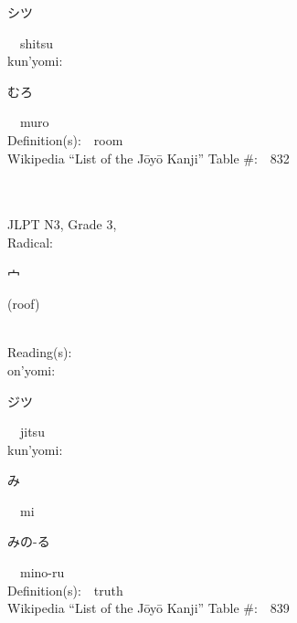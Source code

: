 \begin{multicols}{2}
{\hspace*{2em}}{\begin{CJK}{UTF8}{min} シツ \end{CJK}}\ \ shitsu\ \ \\
{\hspace*{1em}}kun'yomi:\ \ \\
{\hspace*{2em}}{\begin{CJK}{UTF8}{min} むろ \end{CJK}}\ \ muro\ \ \\
Definition(s):\ \ room \\
Wikipedia ``List of the J\=oy\=o Kanji'' Table \#:\ \ 832 \\
\ \ \\
{\fontsize{34pt}{40pt}  }\ \ \\  %
{JLPT N3, Grade 3, \\Radical:\ \ {\begin{CJK}{UTF8}{min} 宀 \end{CJK}} (roof) } \\
Reading(s):\ \ \\
{\hspace*{1em}}on'yomi:\ \ \\
{\hspace*{2em}}{\begin{CJK}{UTF8}{min} ジツ \end{CJK}}\ \ jitsu\ \ \\
{\hspace*{1em}}kun'yomi:\ \ \\
{\hspace*{2em}}{\begin{CJK}{UTF8}{min} み \end{CJK}}\ \ mi\ \ \\
{\hspace*{2em}}{\begin{CJK}{UTF8}{min} みの-る \end{CJK}}\ \ mino-ru\ \ \\
Definition(s):\ \ truth \\
Wikipedia ``List of the J\=oy\=o Kanji'' Table \#:\ \ 839 \\
\ \ \\
{\fontsize{34pt}{40pt}  }\ \ \\  %

\end{multicols}
